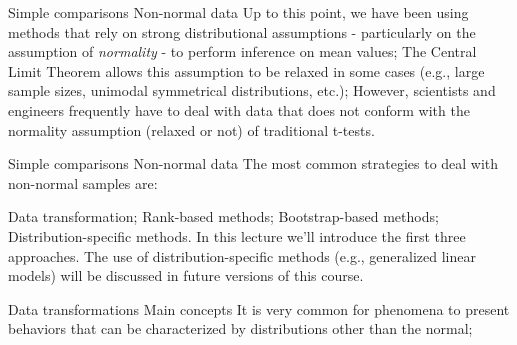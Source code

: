 \documentclass[t]{beamer}
\begin{document}

\begin{ftst}
{Simple comparisons}
{Non-normal data}
Up to this point, we have been using methods that rely on strong distributional assumptions - particularly on the assumption of \textit{normality} - to perform inference on mean values;
\vone
The Central Limit Theorem allows this assumption to be relaxed in some cases (e.g., large sample sizes, unimodal symmetrical distributions, etc.); 
\vone
However, scientists and engineers frequently have to deal with data that does not conform with the normality assumption (relaxed or not) of traditional t-tests.
\end{ftst}


\begin{ftst}
{Simple comparisons}
{Non-normal data}
The most common strategies to deal with non-normal samples are:

\bitems Data transformation;
\spitem Rank-based methods;
\spitem Bootstrap-based methods;
\spitem Distribution-specific methods.
\eitem
\vone
In this lecture we'll introduce the first three approaches. The use of distribution-specific methods (e.g., generalized linear models) will be discussed in future versions of this course.
\end{ftst}

\begin{ftst}
{Data transformations}
{Main concepts}
It is very common for phenomena to present behaviors that can be characterized by distributions other than the normal;
\vone


\end{ftst}
\end{document}
